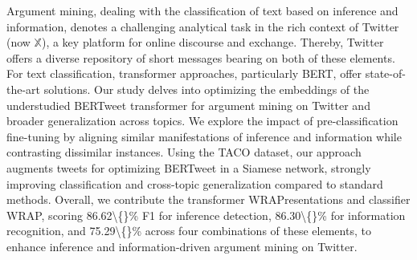 Argument mining, dealing with the classification of text based on inference and information, denotes a challenging analytical task in the rich context of Twitter (now $\mathbb{X}$), a key platform for online discourse and exchange. Thereby, Twitter offers a diverse repository of short messages bearing on both of these elements. For text classification, transformer approaches, particularly BERT, offer state-of-the-art solutions. Our study delves into optimizing the embeddings of the understudied BERTweet transformer for argument mining on Twitter and broader generalization across topics. We explore the impact of pre-classification fine-tuning by aligning similar manifestations of inference and information while contrasting dissimilar instances. Using the TACO dataset, our approach augments tweets for optimizing BERTweet in a Siamese network, strongly improving classification and cross-topic generalization compared to standard methods. Overall, we contribute the transformer WRAPresentations and classifier WRAP, scoring 86.62\textbackslash\{\}\% F1 for inference detection, 86.30\textbackslash\{\}\% for information recognition, and 75.29\textbackslash\{\}\% across four combinations of these elements, to enhance inference and information-driven argument mining on Twitter.